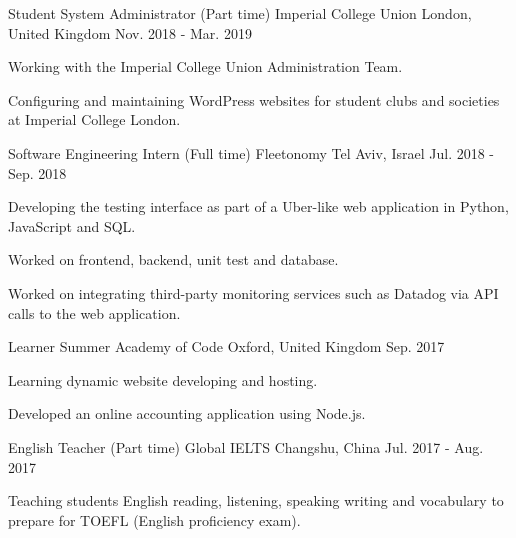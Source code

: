 
\begin{cventries}
  \cventry
    {Student System Administrator (Part time)} %
    {Imperial College Union} %
    {London, United Kingdom} %
    {Nov. 2018 - Mar. 2019} %
    {
      \begin{cvitems} %
        \item {Working with the Imperial College Union Administration Team.}
        \item {Configuring and maintaining WordPress websites for student clubs and societies at Imperial College London.}
      \end{cvitems}
    }

  \cventry
    {Software Engineering Intern (Full time)} %
    {Fleetonomy} %
    {Tel Aviv, Israel} %
    {Jul. 2018 - Sep. 2018} %
    {
      \begin{cvitems} %
        \item {Developing the testing interface as part of a Uber-like web application in Python, JavaScript and SQL.}
        \item {Worked on frontend, backend, unit test and database.}
        \item {Worked on integrating third-party monitoring services such as Datadog via API calls to the web application.}
      \end{cvitems}
    }
    
    \cventry
    {Learner} %
    {Summer Academy of Code} %
    {Oxford, United Kingdom} %
    {Sep. 2017} %
    {
      \begin{cvitems} %
        \item {Learning dynamic website developing and hosting.}
        \item {Developed an online accounting application using Node.js.}
      \end{cvitems}
    }

  \cventry
    {English Teacher (Part time)} %
    {Global IELTS} %
    {Changshu, China} %
    {Jul. 2017 - Aug. 2017} %
    {
      \begin{cvitems} %
        \item {Teaching students English reading, listening, speaking writing and vocabulary to prepare for TOEFL (English
        proficiency exam).}
      \end{cvitems}
    }
    

\end{cventries}
